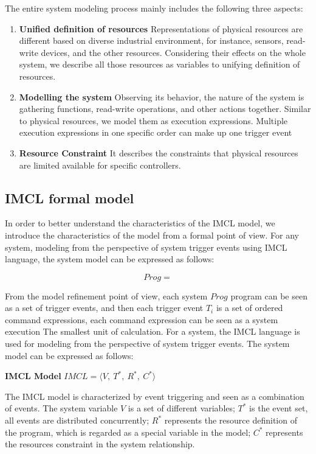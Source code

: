 The entire system modeling process mainly includes the following three aspects:
\begin{enumerate}
  \item \textbf{Unified definition of resources} Representations of physical resources are different based on diverse industrial environment, for instance, sensors, read-write devices, and the other resources. Considering their effects on the whole system, we describe all those resources as variables to unifying definition of resources.
  \item \textbf{Modelling the system} Observing its behavior, the nature of the system is gathering functions, read-write operations, and other actions together. Similar to physical resources, we model them as execution expressions. Multiple execution expressions in one specific order can make up one trigger event
  \item \textbf{Resource Constraint}  It describes the constraints that physical resources are limited available for specific controllers.
\end{enumerate}

\subsection{IMCL formal model}
In order to better understand the characteristics of the IMCL model, we introduce the characteristics of the model from a formal point of view. For any system, modeling from the perspective of system trigger events using IMCL language, the system model can be expressed as follows:

\[ Prog = \]

From the model refinement point of view, each system $Prog$ program can be seen as a set of trigger events, and then each trigger event $T_i$ is a set of ordered command expressions, each command expression can be seen as a system execution The smallest unit of calculation. For a system, the IMCL language is used for modeling from the perspective of system trigger events. The system model can be expressed as follows:

\begin{definition} \textbf{IMCL Model} $IMCL = \langle V, \ T^{*}, \ R^{*}, \ C^{*}\rangle$
\end{definition}
The IMCL model is characterized by event triggering and seen as a combination of events. The system variable $V$ is a set of different variables; $T^{*}$ is the event set, all events are distributed concurrently; $R^{*}$ represents the resource definition of the program, which is regarded as a special variable in the model; $C^{*}$ represents the resources constraint in the system relationship.

